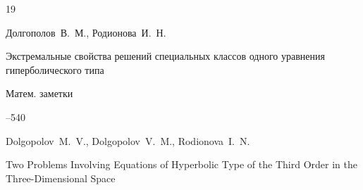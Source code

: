 \begin{thebibliography}{19}












\by Долгополов~В.~М.,  Родионова~И.~Н.

\paper Экстремальные свойства решений специальных классов одного уравнения гиперболического типа

\jour Матем. заметки




--540
















\by Dolgopolov~M.~V., Dolgopolov~V.~M., Rodionova~I.~N.

\paper Two Problems Involving Equations of Hyperbolic Type of the Third Order in the Three-Dimensional Space


\end{thebibliography}
